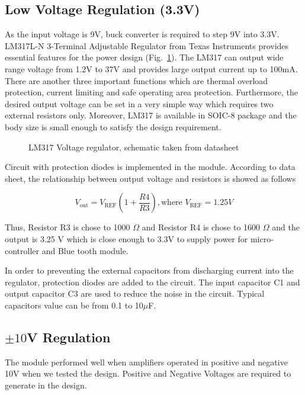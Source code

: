 \subsection{Low Voltage Regulation (3.3V)}
As the input voltage is 9V, buck converter is required to step 9V into 3.3V. LM317L-N 3-Terminal Adjustable Regulator from Texas Instruments provides essential features for the power design (Fig.~\ref{fig:LM317}).  The LM317 can output wide range voltage from 1.2V to 37V and provides large output current up to 100mA. There are another three important functions which are thermal overload protection, current limiting and safe operating area protection. Furthermore, the desired output voltage can be set in a very simple way which requires two external resistors only.  Moreover, LM317 is available in SOIC-8 package and the body size is small enough to satisfy the design requirement. 

\begin{figure}[!tbh]
	\centering
	\caption{LM317 Voltage regulator, schematic taken from datasheet\cite{LM317_datasheet}}
	\label{fig:LM317}
\end{figure}

Circuit with protection diodes is implemented in the module.  According to data sheet, the relationship between output voltage and resistors is showed as follows

\begin{equation}
V_{\textrm{out}} = V_{\textrm{REF}}\left(1+\frac{R4}{R3}\right), \textrm{where } V_\textrm{REF} = 1.25V
\label{eq:LM317}
\end{equation}

Thus, Resistor R3 is chose to 1000 $\Omega$ and Resistor R4 is chose to 1600 $\Omega$ and the output is 3.25 V which is close enough to 3.3V to supply power for micro-controller and Blue tooth module.

In order to preventing the external capacitors from discharging current into the regulator, protection diodes are added to the circuit. The input capacitor C1 and output capacitor C3 are used to reduce the noise in the circuit.  Typical capacitors value can be from 0.1 to 10$\mu$F. 

\subsection{$\pm10$V Regulation}
The module performed well when amplifiers operated in positive and negative 10V when we tested the design. Positive and Negative Voltages are required to generate in the design.

